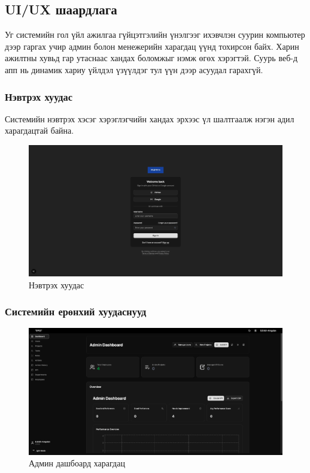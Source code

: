 \subsection{UI/UX шаардлага}
Уг системийн гол үйл ажилгаа гүйцэтгэлийн үнэлгээг ихэвчлэн суурин компьютер дээр гаргах учир админ болон
менежерийн харагдац үүнд тохирсон байх. Харин ажилтны хувьд гар утаснаас хандах боломжыг нэмж өгөх хэрэгтэй.
Суурь веб-д апп нь динамик хариу үйлдэл үзүүлдэг тул үүн дээр асуудал гарахгүй.

\subsubsection{Нэвтрэх хуудас}
Системийн нэвтрэх хэсэг хэрэглэгчийн хандах эрхээс үл шалтгаалж нэгэн адил харагдацтай байна.
\begin{figure}[h]
    \centering
    \includegraphics[scale=0.25]{src/images/uiux/login.png}
    \caption{Нэвтрэх хуудас}
    \label{fig:login_page}
\end{figure}

\subsubsection{Системийн ерөнхий хуудаснууд}

\begin{figure}[H]
    \centering
    \includegraphics[scale=0.25]{src/images/uiux/adminDash.png}
    \caption{Админ дашбоард харагдац}
    \label{fig:admin_dashboard_page}
\end{figure}

